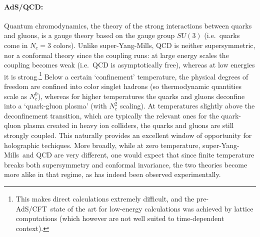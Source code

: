 \documentclass[12pt]{article}
\def\AC{AdS/CFT}
\def\SYM{super-Yang-Mills}
\begin{document}
\paragraph{AdS/QCD:}  %
Quantum chromodynamics, the theory of the strong interactions between quarks and gluons, is a gauge theory based on the gauge group $SU(3)$ (i.e.\ quarks come in $N_c =3$ colors).  Unlike \SYM, QCD is neither supersymmetric, nor a conformal theory since the coupling runs: at large energy scales the coupling becomes weak (i.e.\ QCD is asymptotically free), whereas at low energies it is strong.\footnote{
This makes direct calculations extremely difficult, and the pre-\AC\ state of the art for low-energy calculations was achieved by lattice computations (which however are not well suited to time-dependent context).
}  Below a certain  `confinement' temperature, the physical degrees of freedom are confined into color singlet hadrons (so thermodynamic quantities scale as $N_c^0$), whereas for higher temperatures the quarks and gluons deconfine into a `quark-gluon plasma' (with $N_c^2$ scaling).  At temperatures slightly above the deconfinement transition, which are typically the relevant ones for the quark-qluon plasma created in heavy ion colliders, the quarks and gluons are still strongly coupled. This naturally provides an excellent window of opportunity for holographic techiques.
    More broadly,  while at zero temperature, \SYM\ and QCD are very different, one would expect that since finite temperature breaks both supersymmetry and conformal invariance,  the two theories become more alike in that regime, as has indeed been observed experimentally.
\end{document}
